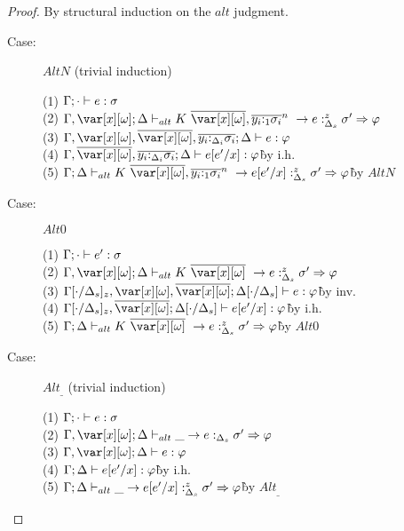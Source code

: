 \begin{proof}
By structural induction on the $alt$ judgment.

\begin{description}
\item[Case:] $AltN$ (trivial induction)
\begin{tabbing}
    (1) $\Gamma; \cdot \vdash e : \sigma$\\
    (2) $\G,\xo;\D \vdash_{alt} \konstructor~\to e :^z_{\D_s} \s' \Rightarrow \vp$\\
    (3) $\G,\xo,\ov{\xo},\ov{y_i{:}_{\D_i}\s_i}; \D \vdash e : \vp $\\
    (4) $\G,\ov{\xo},\ov{y_i{:}_{\D_i}\s_i}; \D \vdash e[e'/x] : \vp $\` by i.h.\\
    (5) $\G;\D \vdash_{alt} \konstructor~\to e[e'/x] :^z_{\D_s} \s' \Rightarrow \vp$\` by $AltN$\\
\end{tabbing}

\item[Case:] $Alt0$
\begin{tabbing}
    (1) $\Gamma;\cdot \vdash e' : \sigma$\\
    (2) $\G,\xo; \D \vdash_{alt} K~\ov{\xo}~\to e :^z_{\D_s} \s' \Rightarrow \vp$\\
    (3) $\G[\cdot/\D_s]_z,\xo,\ov{\xo}; \D[\cdot/\D_s] \vdash e : \vp$\` by inv.\\
    (4) $\G[\cdot/\D_s]_z,\ov{\xo}; \D[\cdot/\D_s] \vdash e[e'/x] : \vp$\` by i.h.\\
    (5) $\G; \D \vdash_{alt} K~\ov{\xo}~\to e :^z_{\D_s} \s' \Rightarrow \vp$\` by $Alt0$\\
\end{tabbing}

\item[Case:] $Alt_\_$ (trivial induction)
\begin{tabbing}
    (1) $\Gamma;\cdot \vdash e : \sigma$\\
    (2) $\G,\xo;\D \vdash_{alt} \_ \to e :_{\D_s} \s' \Rightarrow \vp$\\
    (3) $\G,\xo;\D \vdash e : \vp$\\
    (4) $\Gamma;\Delta \vdash e[e'/x] : \varphi$\` by i.h.\\
    (5) $\Gamma;\Delta \vdash_{alt} \_ \to e[e'/x] :^z_{\Delta_s} \sigma' \Rightarrow \varphi$\` by $Alt_\_$\\
\end{tabbing}

\end{description}
\end{proof}
